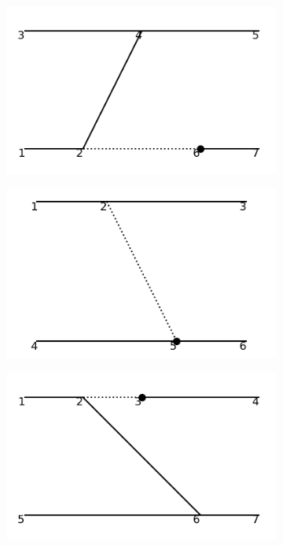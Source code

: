 \documentclass[11pt,a4paper,twoside,pdf]{article}
\numberwithin{equation}{section}
\begin{document}
\begin{figure}[h!]
\begin{subfigure}[t]{0.16\textwidth}
    \end{subfigure}
    \hfill
    \begin{subfigure}[t]{0.16\textwidth}
        \centering
        \includegraphics[width=\textwidth]{plots/order4_2to2/counterterms/10.png}
    \end{subfigure}
    \hfill
    \begin{subfigure}[t]{0.16\textwidth}
        \centering
        \includegraphics[width=\textwidth]{plots/order4_2to2/counterterms/11.png}
    \end{subfigure}
    \hfill
    \begin{subfigure}[t]{0.16\textwidth}
        \centering
        \includegraphics[width=\textwidth]{plots/order4_2to2/counterterms/12.png}

\end{subfigure}
\end{figure}
\end{document}
